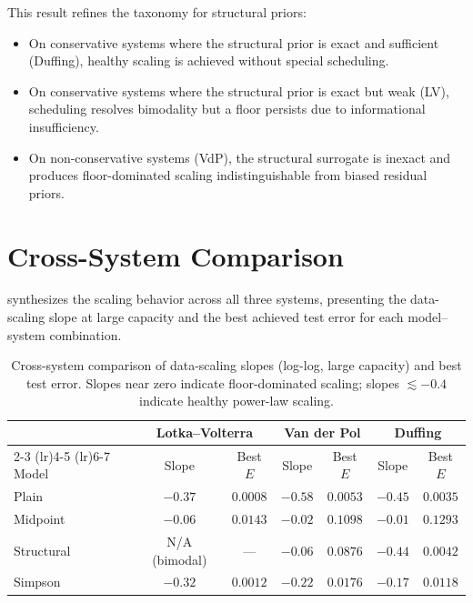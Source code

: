 \documentclass[11pt]{article}
\begin{document}
This result refines the taxonomy for structural priors:
\begin{itemize}[leftmargin=*]
    \item On conservative systems where the structural prior is exact and sufficient (Duffing), healthy scaling is achieved without special scheduling.
    \item On conservative systems where the structural prior is exact but weak (LV), scheduling resolves bimodality but a floor persists due to informational insufficiency.
    \item On non-conservative systems (VdP), the structural surrogate is inexact and produces floor-dominated scaling indistinguishable from biased residual priors.
\end{itemize}

\section{Cross-System Comparison}
\label{sec:cross-system}

 synthesizes the scaling behavior across all three systems, presenting the data-scaling slope at large capacity and the best achieved test error for each model--system combination.

\begin{table}[H]
    \centering
    \caption{Cross-system comparison of data-scaling slopes (log-log, large capacity) and best test error.
    Slopes near zero indicate floor-dominated scaling; slopes $\lesssim -0.4$ indicate healthy power-law scaling.}
    \label{tab:cross-system}
    \small
    \begin{tabular}{l cc cc cc}
        \toprule
        & \multicolumn{2}{c}{Lotka--Volterra} & \multicolumn{2}{c}{Van der Pol} & \multicolumn{2}{c}{Duffing} \\
        \cmidrule(lr){2-3} \cmidrule(lr){4-5} \cmidrule(lr){6-7}
        Model & Slope & Best $E$ & Slope & Best $E$ & Slope & Best $E$ \\
        \midrule
        Plain       & $-0.37$ & $0.0008$ & $-0.58$ & $0.0053$ & $-0.45$ & $0.0035$ \\
        Midpoint    & $-0.06$ & $0.0143$ & $-0.02$ & $0.1098$ & $-0.01$ & $0.1293$ \\
        Structural  & N/A (bimodal) & --- & $-0.06$ & $0.0876$ & $-0.44$ & $0.0042$ \\
        Simpson     & $-0.32$ & $0.0012$ & $-0.22$ & $0.0176$ & $-0.17$ & $0.0118$ \\
        \bottomrule
    \end{tabular}
\end{table}
\end{document}
